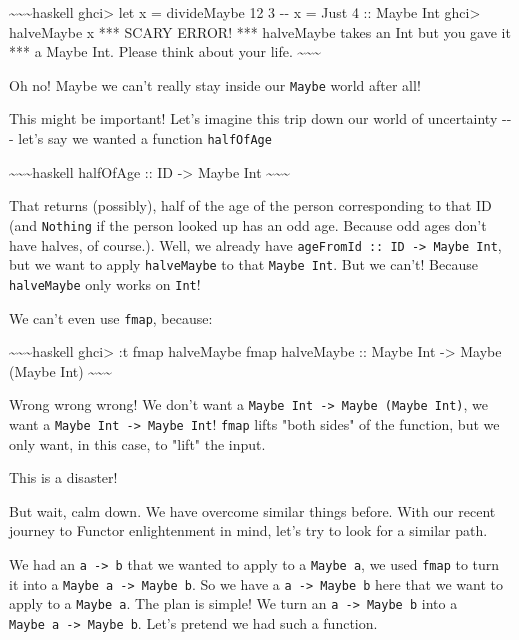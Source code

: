 \documentclass[]{article}
\begin{document}
\textasciitilde{}\textasciitilde{}\textasciitilde{}haskell ghci\textgreater{}
let x = divideMaybe 12 3 -\/- x = Just 4 :: Maybe Int ghci\textgreater{}
halveMaybe x *** SCARY ERROR! *** halveMaybe takes an Int but you gave it *** a
Maybe Int. Please think about your life.
\textasciitilde{}\textasciitilde{}\textasciitilde{}

Oh no! Maybe we can't really stay inside our \texttt{Maybe} world after all!

This might be important! Let's imagine this trip down our world of uncertainty
-\/-\/- let's say we wanted a function \texttt{halfOfAge}

\textasciitilde{}\textasciitilde{}\textasciitilde{}haskell halfOfAge :: ID
-\textgreater{} Maybe Int \textasciitilde{}\textasciitilde{}\textasciitilde{}

That returns (possibly), half of the age of the person corresponding to that ID
(and \texttt{Nothing} if the person looked up has an odd age. Because odd ages
don't have halves, of course.). Well, we already have
\texttt{ageFromId\ ::\ ID\ -\textgreater{}\ Maybe\ Int}, but we want to apply
\texttt{halveMaybe} to that \texttt{Maybe\ Int}. But we can't! Because
\texttt{halveMaybe} only works on \texttt{Int}!

We can't even use \texttt{fmap}, because:

\textasciitilde{}\textasciitilde{}\textasciitilde{}haskell ghci\textgreater{} :t
fmap halveMaybe fmap halveMaybe :: Maybe Int -\textgreater{} Maybe (Maybe Int)
\textasciitilde{}\textasciitilde{}\textasciitilde{}

Wrong wrong wrong! We don't want a
\texttt{Maybe\ Int\ -\textgreater{}\ Maybe\ (Maybe\ Int)}, we want a
\texttt{Maybe\ Int\ -\textgreater{}\ Maybe\ Int}! \texttt{fmap} lifts "both
sides" of the function, but we only want, in this case, to "lift" the input.

This is a disaster!

But wait, calm down. We have overcome similar things before. With our recent
journey to Functor enlightenment in mind, let's try to look for a similar path.

We had an \texttt{a\ -\textgreater{}\ b} that we wanted to apply to a
\texttt{Maybe\ a}, we used \texttt{fmap} to turn it into a
\texttt{Maybe\ a\ -\textgreater{}\ Maybe\ b}. So we have a
\texttt{a\ -\textgreater{}\ Maybe\ b} here that we want to apply to a
\texttt{Maybe\ a}. The plan is simple! We turn an
\texttt{a\ -\textgreater{}\ Maybe\ b} into a
\texttt{Maybe\ a\ -\textgreater{}\ Maybe\ b}. Let's pretend we had such a
function.
\end{document}
